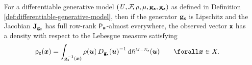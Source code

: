 \begin{proposition}\label{prop:change-of-variables-in-dgm}
For a differentiable generative model $(\mathit{U},\mathcal{F}\kern-2pt,\rho,\mu,{\mathbf{g}}_{\boldsymbol{\mathsf{x}}},{\mathbf{g}}_{\boldsymbol{\mathsf{z}}})$ as defined in Definition \ref{def:differentiable-generative-model}, then if the generator ${\mathbf{g}}_{\boldsymbol{\mathsf{x}}}$ is Lipschitz and the Jacobian $\mathbf{J}_{{\mathbf{g}}_{\boldsymbol{\mathsf{x}}}}$ has full row-rank $\mathsf{P}_{\boldsymbol{\mathsf{u}}}$-almost everywhere, the observed vector $\boldsymbol{\mathsf{x}}$ has a density with respect to the Lebesgue measure satisfying
\begin{equation}\label{eq:dgm-marginal-density-x}
  \pden{\rvct{x}}({\vct{x}})  =
  \int_{\preimage{\genfunc_{\rvct{x}}}{\vct{x}}}
    \rho(\vct{u})\,
    \jacobproddet{\genfunc_{\rvct{x}}}{\vct{u}}^{-1}
  \,\dr\haum{M-N_{\rvct{x}}}(\vct{u})
  \qquad \forall \vct{x} \in\set{X}.
\end{equation}
\end{proposition}
